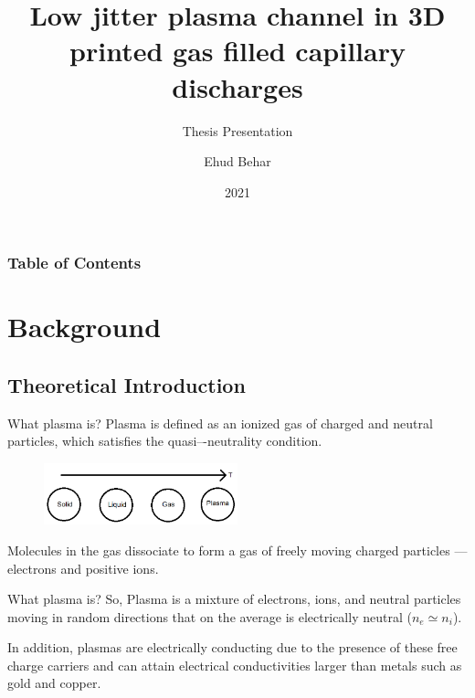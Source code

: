 \documentclass[final]{beamer}
\title{Low jitter plasma channel in 3D printed gas filled capillary discharges}
\subtitle{Thesis Presentation}
\author{Ehud Behar}
\institute{Hebrew University of Jerusalem}
\date{2021}
\begin{document}
\frame{\titlepage}
\begin{frame}
\frametitle{Table of Contents}
\tableofcontents
\end{frame}

\section{Background}
\subsection{Theoretical Introduction}
\newcommand{\whatisplasma}{What plasma is?}
\begin{frame}{\whatisplasma}
Plasma is defined as an ionized gas of charged and neutral particles, which  satisfies  the quasi–-neutrality condition.
\begin{figure}
    \centering
    \includegraphics[width=0.5\textwidth]{figures/temp_and_states.png}
\end{figure}
Molecules in the gas dissociate to form a gas of freely moving charged particles --- electrons and positive ions.
\end{frame}
\begin{frame}{\whatisplasma}
So, Plasma is a mixture of electrons, ions, and neutral particles moving in random directions that on the average is electrically neutral ($n_e \simeq n_i$).

In addition, plasmas are electrically conducting due to the presence of these free charge carriers and can attain electrical conductivities larger than metals such as gold and copper.
\end{frame}
\newcommand{\debye}{Debye shielding length}
\end{document}
